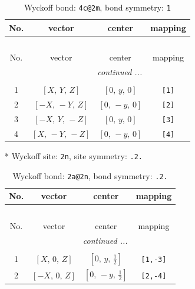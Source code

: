 \documentclass[fleqn,8pt]{jsarticle}
\begin{document}
\begin{longtable}{cccc}
\caption{Wyckoff bond: {\tt 4c@2m}, bond symmetry: {\tt 1}}
 \\
 \hline \hline
No. & vector & center & mapping \\ \hline \endfirsthead

\multicolumn{3}{l}{\tablename\ \thetable{}} \\
 \hline \hline
No. & vector & center & mapping \\ \hline \endhead

 \hline \hline
\multicolumn{3}{r}{\footnotesize\it continued ...} \\ \endfoot

 \hline \hline
\multicolumn{3}{r}{} \\ \endlastfoot

1 & $\left[ X,\, Y,\, Z \right]$ & $\left[ 0,\, y,\, 0 \right]$ & {\tt [1]} \\ \hline
2 & $\left[ - X,\, - Y,\, Z \right]$ & $\left[ 0,\, - y,\, 0 \right]$ & {\tt [2]} \\ \hline
3 & $\left[ - X,\, Y,\, - Z \right]$ & $\left[ 0,\, y,\, 0 \right]$ & {\tt [3]} \\ \hline
4 & $\left[ X,\, - Y,\, - Z \right]$ & $\left[ 0,\, - y,\, 0 \right]$ & {\tt [4]} \\
\end{longtable}
* Wyckoff site: {\tt 2n}, site symmetry: {\tt .2.}
\renewcommand{\arraystretch}{1.2}
\begin{longtable}{cccc}
\caption{Wyckoff bond: {\tt 2a@2n}, bond symmetry: {\tt .2.}}
 \\
 \hline \hline
No. & vector & center & mapping \\ \hline \endfirsthead

\multicolumn{3}{l}{\tablename\ \thetable{}} \\
 \hline \hline
No. & vector & center & mapping \\ \hline \endhead

 \hline \hline
\multicolumn{3}{r}{\footnotesize\it continued ...} \\ \endfoot

 \hline \hline
\multicolumn{3}{r}{} \\ \endlastfoot

1 & $\left[ X,\, 0,\, Z \right]$ & $\left[ 0,\, y,\, \frac{1}{2} \right]$ & {\tt [1,-3]} \\ \hline
2 & $\left[ - X,\, 0,\, Z \right]$ & $\left[ 0,\, - y,\, \frac{1}{2} \right]$ & {\tt [2,-4]} \\
\end{longtable}
\end{document}
